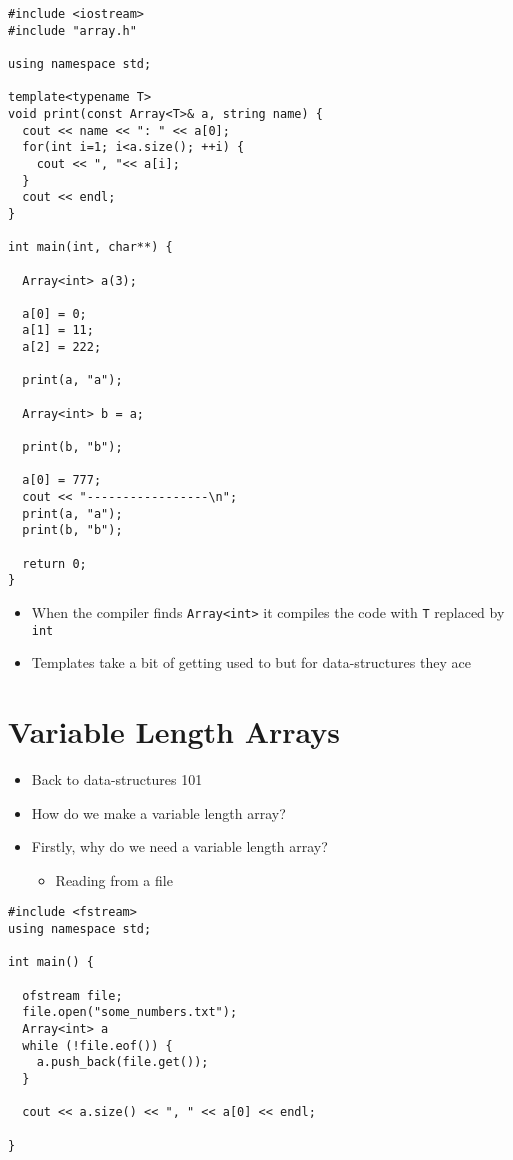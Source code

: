 \documentclass[11pt]{article}
\begin{document}
\begin{verbatim}
#include <iostream>
#include "array.h"

using namespace std;

template<typename T>
void print(const Array<T>& a, string name) {
  cout << name << ": " << a[0];
  for(int i=1; i<a.size(); ++i) {
    cout << ", "<< a[i];
  }
  cout << endl;
}

int main(int, char**) {

  Array<int> a(3);

  a[0] = 0;
  a[1] = 11;
  a[2] = 222;

  print(a, "a");

  Array<int> b = a;

  print(b, "b");

  a[0] = 777;
  cout << "-----------------\n";
  print(a, "a");
  print(b, "b");

  return 0;
}
\end{verbatim}
\begin{itemize}
\item When the compiler finds \texttt{Array<int>} it compiles the code with \texttt{T}
replaced by \texttt{int}
\item Templates take a bit of getting used to but for data-structures they ace
\end{itemize}

\section{Variable Length Arrays}
\label{sec:org1f320f9}
\begin{itemize}
\item Back to data-structures 101
\item How do we make a variable length array?
\item Firstly, why do we need a variable length array?
\begin{itemize}
\item Reading from a file
\end{itemize}
\end{itemize}
\begin{verbatim}
#include <fstream>
using namespace std;

int main() {

  ofstream file;
  file.open("some_numbers.txt");
  Array<int> a
  while (!file.eof()) {
    a.push_back(file.get());
  }

  cout << a.size() << ", " << a[0] << endl;

}
\end{verbatim}
\end{document}
